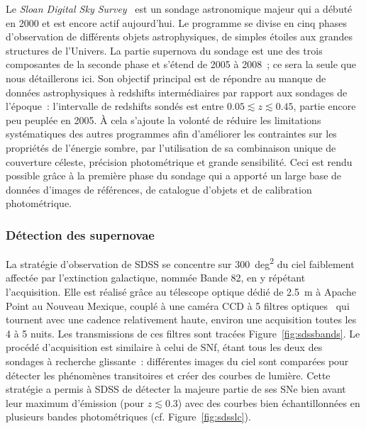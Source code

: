 \documentclass[../main/main.tex]{subfiles}
\begin{document}
Le \textit{Sloan Digital Sky Survey}~\citep[SDSS,][]{frieman2008, sako2008,
sako2018} est un sondage astronomique majeur qui a débuté en 2000 et est encore
actif aujourd'hui. Le programme se divise en cinq phases d'observation de
différents objets astrophysiques, de simples étoiles aux grandes structures de
l'Univers. La partie supernova du sondage est une des trois composantes de la
seconde phase et s'étend de 2005 à 2008~; ce sera la seule que nous détaillerons
ici. Son objectif principal est de répondre au manque de données astrophysiques
à redshifts intermédiaires par rapport aux sondages de l'époque~: l'intervalle
de redshifts sondés est entre $0.05 \lesssim z \lesssim 0.45$, partie encore peu
peuplée en 2005. À cela s'ajoute la volonté de réduire les limitations
systématiques des autres programmes afin d'améliorer les contraintes sur les
propriétés de l'énergie sombre, par l'utilisation de sa combinaison unique de
couverture céleste, précision photométrique et grande sensibilité. Ceci est
rendu possible grâce à la première phase du sondage qui a apporté un large base
de données d'images de références, de catalogue d'objets et de calibration
photométrique.

\subsubsection{Détection des supernovae}\label{sssec:sdssdetec}

La stratégie d'observation de SDSS se concentre sur \SI{300}{deg^2} du ciel
faiblement affectée par l'extinction galactique, nommée Bande 82, en y répétant
l'acquisition. Elle est réalisé grâce au télescope optique dédié de \SI{2.5}{m}
\citep{gunn2006} à Apache Point au Nouveau Mexique, couplé à une caméra CCD
\citep{gunn1998} à 5 filtres optiques~\citep[$ugriz$,][]{fukugita1996} qui
tournent avec une cadence relativement haute, environ une acquisition toutes les
4 à 5 nuits. Les transmissions de ces filtres sont tracées
Figure~\ref{fig:sdssbands}. Le procédé d'acquisition est similaire à celui de
SNf, étant tous les deux des sondages à recherche glissante~: différentes images
du ciel sont comparées pour détecter les phénomènes transitoires et créer des
courbes de lumière. Cette stratégie a permis à SDSS de détecter la majeure
partie de ses SNe bien avant leur maximum d'émission (pour $z \lesssim 0.3$)
avec des courbes bien échantillonnées en plusieurs bandes photométriques (cf.
Figure~\ref{fig:sdsslc}).
\end{document}
